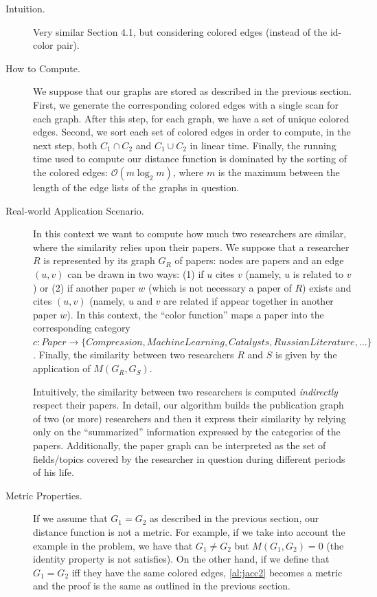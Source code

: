 \documentclass[12pt,a4paper]{article}
\begin{document}
\begin{description}
\item[Intuition.] Very similar Section 4.1, but considering colored edges (instead of the id-color pair).

\item[How to Compute.] We suppose that our graphs are stored as described in the previous section. First, we generate the corresponding colored edges with a single scan for each graph. After this step, for each graph, we have a set of unique colored edges. Second, we sort each set of colored edges in order to compute, in the next step, both $C_1 \cap C_2$ and $C_1 \cup C_2$ in linear time. Finally, the running time used to compute our distance function is dominated by the sorting of the colored edges: $\mathcal{O}(m \log_2 m)$, where $m$ is the maximum between the length of the edge lists of the graphs in question.

\item[Real-world Application Scenario.] In this context we want to compute how much two researchers are similar, where the similarity relies upon their papers. We suppose that a researcher $R$ is represented by its graph $G_R$ of papers: nodes are papers and an edge $(u, v)$ can be drawn in two ways: (1) if $u$ cites $v$ (namely, $u$ is related to $v$) or (2) if another paper $w$ (which is not necessary a paper of $R$) exists and cites $(u, v)$ (namely, $u$ and $v$ are related if appear together in another paper $w$). In this context, the ``color function'' maps a paper into the corresponding category $c : Paper \rightarrow \{ Compression, Machine Learning, Catalysts, Russian Literature, \dots \}$. Finally, the similarity between two researchers $R$ and  $S$ is given by the application of $M(G_R, G_S)$.


Intuitively, the similarity between two researchers is computed \textit{indirectly} respect their papers. In detail, our algorithm builds the publication graph of two (or more) researchers and then it express their similarity by relying only on the ``summarized'' information expressed by the categories of the papers. Additionally, the paper graph can be interpreted as the set of fields/topics covered by the researcher in question during different periods of his life.

\item[Metric Properties.] If we assume that $G_1 = G_2$ as described in the previous section, our distance function is not a metric. For example, if we take into account the example in the problem, we have that $G_1 \not= G_2$ but $M(G_1, G_2) = 0$ (the identity property is not satisfies). On the other hand, if we define that $G_1 = G_2$ iff they have the same colored edges, \eqref{al:jacc2} becomes a metric and the proof is the same as outlined in the previous section.

\end{description}
\end{document}
